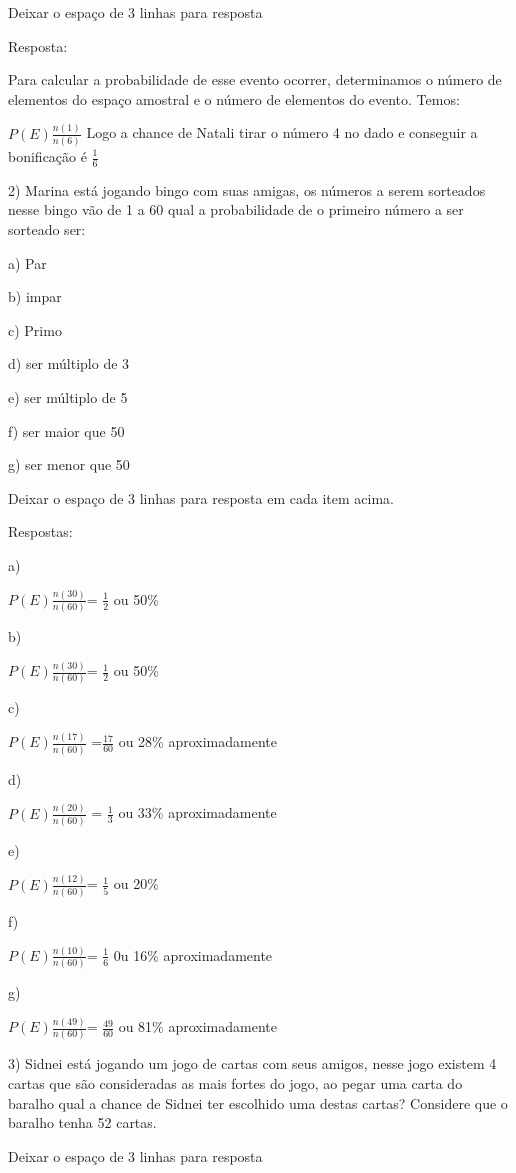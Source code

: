 Deixar o espaço de 3 linhas para resposta

Resposta:

Para calcular a probabilidade de esse evento ocorrer, determinamos o
número de elementos do espaço amostral e o número de elementos do
evento. Temos:

\(P(E)\frac{n(1)}{n(6)}\) Logo a chance de Natali tirar o número 4 no
dado e conseguir a bonificação é \(\frac{1}{6}\)

2) Marina está jogando bingo com suas amigas, os números a serem
sorteados nesse bingo vão de 1 a 60 qual a probabilidade de o primeiro
número a ser sorteado ser:

a) Par

b) impar

c) Primo

d) ser múltiplo de 3

e) ser múltiplo de 5

f) ser maior que 50

g) ser menor que 50

Deixar o espaço de 3 linhas para resposta em cada item acima.

Respostas:

a)

\(P(E)\frac{n(30)}{n(60)}\)= \(\frac{1}{2}\) ou 50\%

b)

\(P(E)\frac{n(30)}{n(60)}\)= \(\frac{1}{2}\) ou 50\%

c)

\(P(E)\frac{n(17)}{n(60)}\) =\(\frac{17}{60}\) ou 28\% aproximadamente

d)

\(P(E)\frac{n(20)}{n(60)}\) = \(\frac{1}{3}\) ou 33\% aproximadamente

e)

\(P(E)\frac{n(12)}{n(60)}\)= \(\frac{1}{5}\) ou 20\%

f)

\(P(E)\frac{n(10)}{n(60)}\)= \(\frac{1}{6}\) 0u 16\% aproximadamente

g)

\(P(E)\frac{n(49)}{n(60)}\)= \(\frac{49}{60}\) ou 81\% aproximadamente

3) Sidnei está jogando um jogo de cartas com seus amigos, nesse jogo
existem 4 cartas que são consideradas as mais fortes do jogo, ao pegar
uma carta do baralho qual a chance de Sidnei ter escolhido uma destas
cartas? Considere que o baralho tenha 52 cartas.

Deixar o espaço de 3 linhas para resposta

